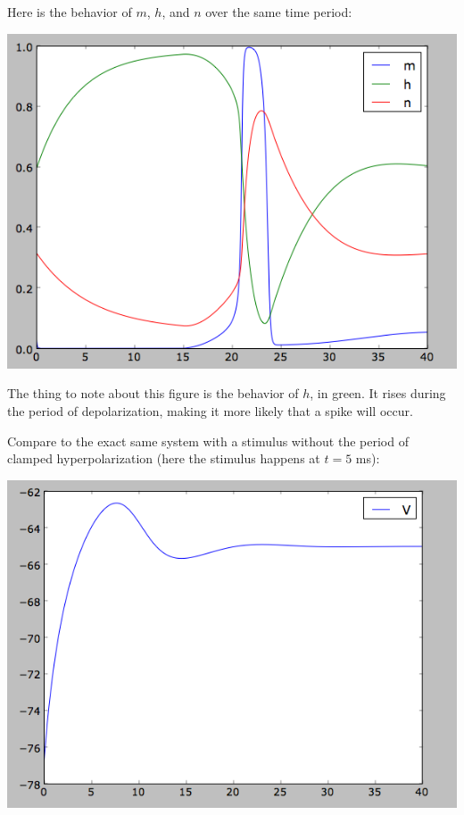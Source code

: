 \documentclass[12pt]{article}
\begin{document}
Here is the behavior of $m$, $h$, and  $n$ over the same time period:

\vspace{10pt}
\includegraphics[scale=0.54]{mhnhyper.png}
\vspace{10pt}

The thing to note about this figure is the behavior of $h$, in green.  It rises during the period of depolarization, making it more likely that a spike will occur.

Compare to the exact same system with a stimulus without the period of clamped hyperpolarization (here the stimulus happens at $t=5$ ms):

\vspace{10pt}
\includegraphics[scale=0.41]{nonhypernonspike.png}
\vspace{10pt}
\end{document}
